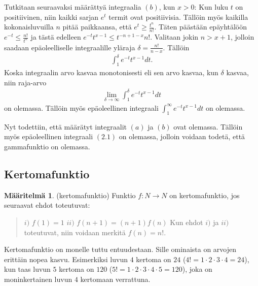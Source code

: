 \documentclass[12pt]{article}
\theoremstyle{definition}
\newtheorem{maar}{Määritelmä}
\theoremstyle{plain}
\numberwithin{equation}{section}
\begin{document}
Tutkitaan seuraavaksi määrättyä integraalia $(b)$, kun $x>0$: \newline
Kun luku $t$ on positiivinen, niin kaikki sarjan $e^t$ termit ovat positiivisia. Tällöin myös kaikilla kokonaisluvuilla $n$ pitää paikkaansa, että $e^t\ge\frac{t^n}{n!}$. Täten päästään epäyhtälöön $e^{-t}\le\frac{n!}{t^n}$ ja tästä edelleen $e^{-t}t^{x-1}\le{t^{-{n+1-x}}}{n!}$. Valitaan jokin $n>x+1$, jolloin saadaan epäoleelliselle integraalille yläraja $\delta=\frac{n!}{n-x}$. Tällöin
\begin{align*}
    \int_1^{\delta}e^{-t}t^{x-1}dt.
\end{align*}
Koska integraalin arvo kasvaa monotonisesti eli sen arvo kasvaa, kun $\delta$ kasvaa, niin raja-arvo 
\begin{align*}
    \lim_{\delta\to\infty}\int_1^{\delta}e^{-t}t^{x-1}dt
\end{align*}
on olemassa. Tällöin myös epäoleellinen integraali $\int_1^{\infty}e^{-t}t^{x-1}dt$ on olemassa.\newline

Nyt todettiin, että määrätyt integraalit $(a)$ ja $(b)$ ovat olemassa. Tällöin myös epäoleellinen integraali $(2.1)$ on olemassa, jolloin voidaan todetä, että gammafunktio on olemassa.



\subsection{Kertomafunktio}
\begin{maar}
(kertomafunktio)
Funktio $f: N \rightarrow N$ on kertomafunktio, jos seuraavat ehdot toteutuvat:
\begin{quote}
    $i)$ $f(1)=1$ \newline
    $ii)$ $f(n+1)=(n+1)f(n)$ \newline
    Kun ehdot $i)$ ja $ii)$ toteutuvat, niin voidaan merkitä $f(n)=n!$.
\end{quote}
\end{maar}
Kertomafunktio on monelle tuttu entuudestaan. Sille ominaista on arvojen erittäin nopea kasvu. Esimerkiksi luvun $4$ kertoma on $24$ ($4! = 1\cdot 2\cdot3\cdot4=24$), kun taas luvun $5$ kertoma on $120$ ($5! = 1\cdot2\cdot3\cdot4\cdot5=120$), joka on moninkertainen luvun $4$ kertomaan verrattuna.
\end{document}
